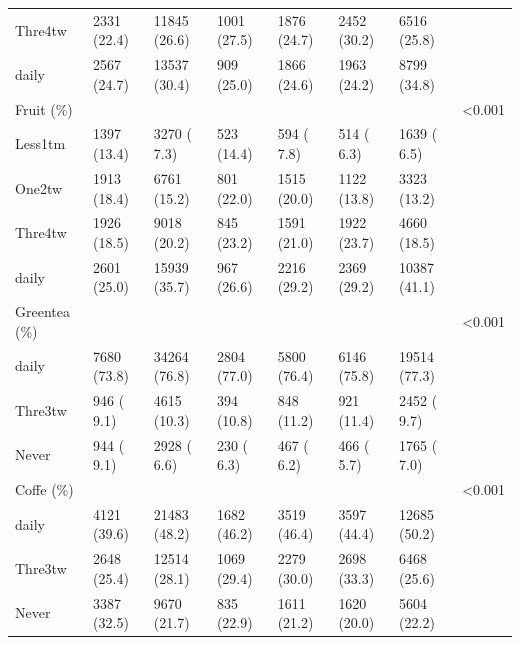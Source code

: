 \documentclass[]{tufte-handout}
\begin{document}
\begin{table}[ht]
\begin{tabular}[t]{llllllll}
\rowcolor{gray!6}  \hspace{1em}Thre4tw & 2331 (22.4) & 11845 (26.6) & 1001 (27.5) & 1876 (24.7) & 2452 (30.2) & 6516 (25.8) & \\
\hspace{1em}daily & 2567 (24.7) & 13537 (30.4) & 909 (25.0) & 1866 (24.6) & 1963 (24.2) & 8799 (34.8) & \\
\rowcolor{gray!6}  Fruit (\%) &  &  &  &  &  &  & <0.001\\
\hspace{1em}Less1tm & 1397 (13.4) & 3270 ( 7.3) & 523 (14.4) & 594 ( 7.8) & 514 ( 6.3) & 1639 ( 6.5) & \\
\rowcolor{gray!6}  \hspace{1em}One2tw & 1913 (18.4) & 6761 (15.2) & 801 (22.0) & 1515 (20.0) & 1122 (13.8) & 3323 (13.2) & \\
\hspace{1em}Thre4tw & 1926 (18.5) & 9018 (20.2) & 845 (23.2) & 1591 (21.0) & 1922 (23.7) & 4660 (18.5) & \\
\rowcolor{gray!6}  \hspace{1em}daily & 2601 (25.0) & 15939 (35.7) & 967 (26.6) & 2216 (29.2) & 2369 (29.2) & 10387 (41.1) & \\
Greentea (\%) &  &  &  &  &  &  & <0.001\\
\rowcolor{gray!6}  \hspace{1em}daily & 7680 (73.8) & 34264 (76.8) & 2804 (77.0) & 5800 (76.4) & 6146 (75.8) & 19514 (77.3) & \\
\hspace{1em}Thre3tw & 946 ( 9.1) & 4615 (10.3) & 394 (10.8) & 848 (11.2) & 921 (11.4) & 2452 ( 9.7) & \\
\rowcolor{gray!6}  \hspace{1em}Never & 944 ( 9.1) & 2928 ( 6.6) & 230 ( 6.3) & 467 ( 6.2) & 466 ( 5.7) & 1765 ( 7.0) & \\
Coffe (\%) &  &  &  &  &  &  & <0.001\\
\rowcolor{gray!6}  \hspace{1em}daily & 4121 (39.6) & 21483 (48.2) & 1682 (46.2) & 3519 (46.4) & 3597 (44.4) & 12685 (50.2) & \\
\hspace{1em}Thre3tw & 2648 (25.4) & 12514 (28.1) & 1069 (29.4) & 2279 (30.0) & 2698 (33.3) & 6468 (25.6) & \\
\rowcolor{gray!6}  \hspace{1em}Never & 3387 (32.5) & 9670 (21.7) & 835 (22.9) & 1611 (21.2) & 1620 (20.0) & 5604 (22.2) & \\

\end{tabular}
\end{table}
\end{document}
